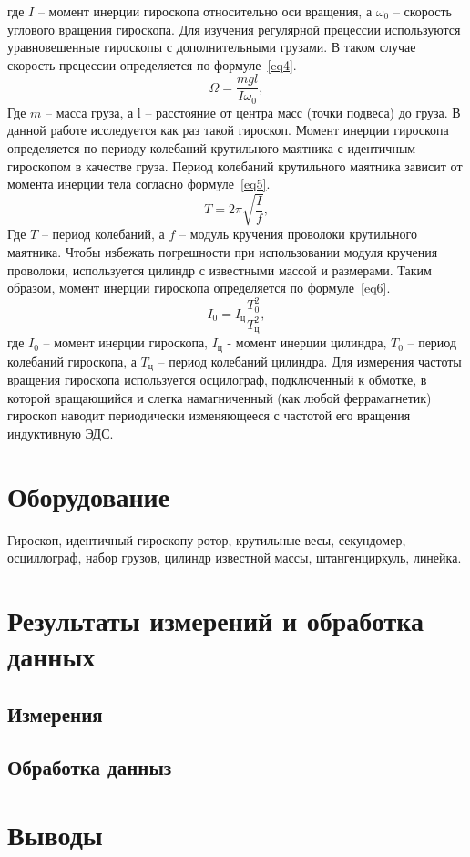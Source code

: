 \documentclass[a4paper,11pt]{article}
\begin{document}
где $I$ -- момент инерции гироскопа относительно оси вращения, а $\omega_{0}$ -- скорость углового вращения гироскопа.\newline
Для изучения регулярной прецессии используются уравновешенные гироскопы с дополнительными грузами. В таком случае скорость прецессии определяется по формуле~\ref{eq4}.\newline
\begin{equation}    \label{eq4}
  \Omega = \frac{mgl}{I \omega_{0}},
\end{equation}
Где $m$ -- масса груза, а l -- расстояние от центра масс (точки подвеса) до груза.\newline
В данной работе исследуется как раз такой гироскоп. Момент инерции гироскопа определяется по периоду колебаний крутильного маятника с идентичным гироскопом в качестве груза. Период колебаний крутильного маятника зависит от момента инерции тела согласно формуле~\ref{eq5}.\newline
\begin{equation}    \label{eq5}
  T = 2 \pi \sqrt{\frac{I}{f}},
\end{equation}
Где $T$ -- период колебаний, а $f$ -- модуль кручения проволоки крутильного маятника.\newline
Чтобы избежать погрешности при использовании модуля кручения проволоки, используется цилиндр с известными массой и размерами. Таким образом, момент инерции гироскопа определяется по формуле~\ref{eq6}.\newline
\begin{equation}    \label{eq6}
  I_{0}=I_{ц}\frac{T_{0}^{2}}{T_{ц}^{2}},
\end{equation}
где $I_{0}$ -- момент инерции гироскопа, $I_{ц}$ - момент инерции цилиндра, $T_{0}$ -- период колебаний гироскопа, а $T_{ц}$ -- период колебаний цилиндра.\newline
Для измерения частоты вращения гироскопа используется осцилограф, подключенный к обмотке, в которой вращающийся и слегка намагниченный (как любой феррамагнетик) гироскоп наводит периодически изменяющееся с частотой его вращения индуктивную ЭДС.
\section{Оборудование}
Гироскоп, идентичный гироскопу ротор, крутильные весы, секундомер, осциллограф, набор грузов, цилиндр известной массы, штангенциркуль, линейка.
\section{Результаты измерений и обработка данных}
\subsection{Измерения}
\subsection{Обработка данныз}
\section{Выводы}
\end{document}
